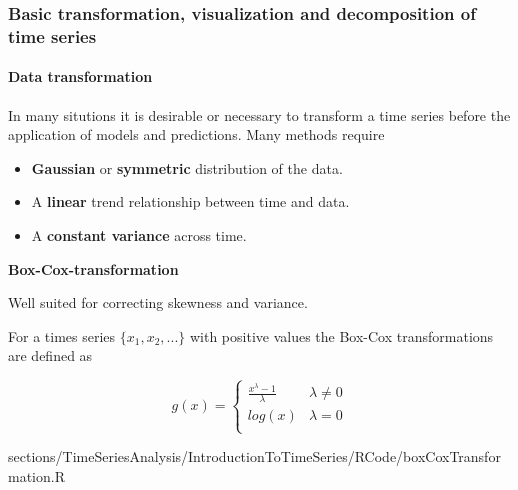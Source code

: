 	
	\subsubsection{Basic transformation, visualization and decomposition of time series}
		\paragraph{Data transformation}
			In many situtions it is desirable or necessary to transform a time series before the application of models and predictions. Many methods require
			\begin{itemize}
				\item \textbf{Gaussian} or \textbf{symmetric} distribution of the data.
				\item A \textbf{linear} trend relationship between time and data.
				\item A \textbf{constant variance} across time.
			\end{itemize}
			
			\RTheory
			{
				\textbf{Box-Cox-transformation}
				
				\vfill
				
				Well suited for correcting skewness and variance.
				
				For a times series $\{x_1, x_2, . . . \}$ with positive values the Box-Cox transformations are defined as
				
				$$ g(x)=
					\begin{cases}
							\frac{x^{\lambda}-1}{\lambda} &\lambda \neq 0\\
							log(x) &\lambda = 0\\
					\end{cases}$$ 
			}
			{
				sections/TimeSeriesAnalysis/IntroductionToTimeSeries/RCode/boxCoxTransformation.R
			}
			
